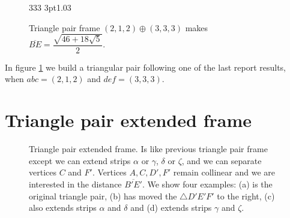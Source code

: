 \documentclass[11pt]{article}
\begin{document}
\begin{figure}[H]
\centering
\begin{center}
 {3}{3}{3} {3pt}{1.0}{3} %
\end{center}
\caption{Triangle pair frame $(2,1,2) \oplus (3,3,3)$ makes $\overline{BE} = \dfrac{\sqrt{46+18\sqrt{5}}}{2}$.}
\label{fig:tripair212333}
\end{figure}

In figure \ref{fig:tripair212333} we build a triangular pair following one of the last report results, when $abc=(2,1,2)$ and $def=(3,3,3)$.


\section{Triangle pair extended frame}

\begin{figure}[H]
 \centering
 \caption{Triangle pair extended frame. Is like previous triangle pair frame except
 we can extend strips $\alpha$ or $\gamma$, $\delta$ or $\zeta$, and we can separate vertices $C$ and $F'$.
 Vertices $A,C,D',F'$ remain collinear and we are interested in the distance $\overline{B'E'}$.
 We show four examples: (a) is the original triangle pair,
 (b) has moved the $\triangle{D'E'F'}$ to the right,
 (c) also extends strips $\alpha$ and $\delta$ and (d) extends strips $\gamma$ and $\zeta$.
 }
 \label{fig:tripairext}
\end{figure}
\end{document}
